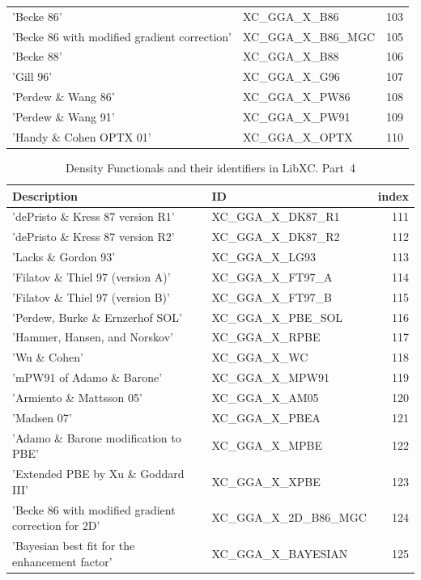 \documentclass[final,12pt]{article}
\begin{document}
{{{{{{\begin{table}[!h]
\begin{center}
\begin{tabular}{llr}
  'Becke 86' & XC\_GGA\_X\_B86  &103\\
  'Becke 86 with modified gradient correction' & XC\_GGA\_X\_B86\_MGC  &105\\
  'Becke 88' & XC\_GGA\_X\_B88  &106\\
  'Gill 96' & XC\_GGA\_X\_G96  &107\\
  'Perdew \& Wang 86' & XC\_GGA\_X\_PW86  &108\\
  'Perdew \& Wang 91' & XC\_GGA\_X\_PW91  &109\\
  'Handy \& Cohen OPTX 01' & XC\_GGA\_X\_OPTX  &110\\
\hline
\hline
\end{tabular}
\end{center}
\end{table}

\begin{table}[!h]
\caption{Density Functionals and their identifiers in LibXC. Part~4}
\begin{center}
\begin{tabular}{llr}
\hline
\hline
Description & ID & index\\
\hline
  'dePristo \& Kress 87 version R1' & XC\_GGA\_X\_DK87\_R1  &111\\
  'dePristo \& Kress 87 version R2' & XC\_GGA\_X\_DK87\_R2  &112\\
  'Lacks \& Gordon 93' & XC\_GGA\_X\_LG93  &113\\
  'Filatov \& Thiel 97 (version A)' & XC\_GGA\_X\_FT97\_A  &114\\
  'Filatov \& Thiel 97 (version B)' & XC\_GGA\_X\_FT97\_B  &115\\
  'Perdew, Burke \& Ernzerhof SOL' & XC\_GGA\_X\_PBE\_SOL  &116\\
  'Hammer, Hansen, and Norskov' & XC\_GGA\_X\_RPBE  &117\\
  'Wu \& Cohen' & XC\_GGA\_X\_WC  &118\\
  'mPW91 of Adamo \& Barone' & XC\_GGA\_X\_MPW91  &119\\
  'Armiento \& Mattsson 05' & XC\_GGA\_X\_AM05  &120\\
  'Madsen 07' & XC\_GGA\_X\_PBEA  &121\\
  'Adamo \& Barone modification to PBE' & XC\_GGA\_X\_MPBE  &122\\
  'Extended PBE by Xu \& Goddard III' & XC\_GGA\_X\_XPBE  &123\\
  'Becke 86 with modified gradient correction for 2D' & XC\_GGA\_X\_2D\_B86\_MGC  &124\\
  'Bayesian best fit for the enhancement factor' & XC\_GGA\_X\_BAYESIAN  &125\\

\end{tabular}
\end{center}
\end{table}}}}}}}
\end{document}
